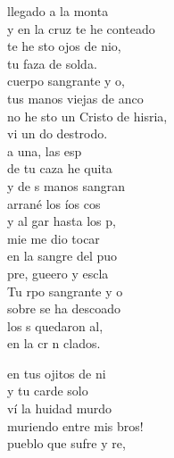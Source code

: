 \begin{cancion}%
	llegado a la monta\\
	y en la cruz te he conteado\\
	te he sto ojos de nio,\\
	tu faza de solda.\\
	\jump
	cuerpo sangrante y o,\\
	tus manos viejas de anco\\
	no he sto un Cristo de hisria,\\
	vi un do destrodo.\\
	\jump
	 a una, las esp \\
	de tu caza he quita \\
	y de s manos sangran \\
	arrané los íos cos\\
	y al gar hasta los p,\\
	mie me dio tocar \\
	en la sangre del puo\\
	pre, gueero y escla \\
	\jump
	Tu rpo sangrante y o\\
	sobre  se ha descoado\\
	los s quedaron al,\\
	en la cr n clados.\jump\\
	\begin{chorus}%
		en tus ojitos de ni \\
		y tu carde solo\\
		ví la huidad murdo\\
		muriendo entre mis bros!\\
		 pueblo que sufre y re,\\

\end{chorus}
\end{cancion}
